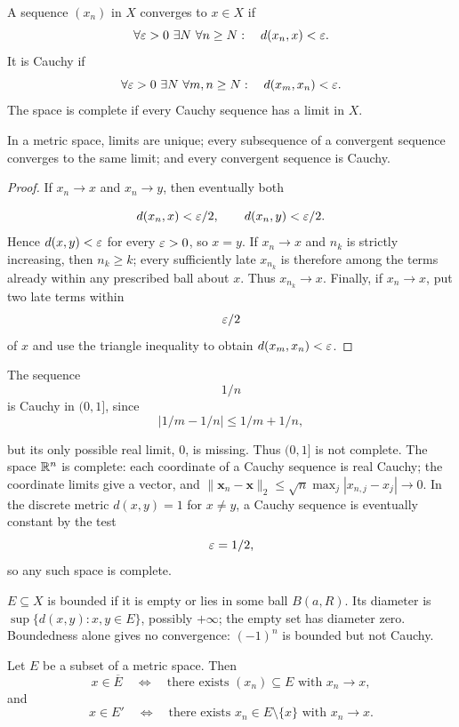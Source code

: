 \begin{definition}
A sequence $(x_n)$ in $X$ converges to $x\in X$ if
\[
\forall\varepsilon>0\ \exists N\ \forall n\geq N:\quad d(x_n,x)<\varepsilon.
\]
It is Cauchy if
\[
\forall\varepsilon>0\ \exists N\ \forall m,n\geq N:\quad d(x_m,x_n)<\varepsilon.
\]
The space is complete if every Cauchy sequence has a limit in $X$.
\end{definition}
\begin{proposition}
\label{prop:metric-sequence-laws}
In a metric space, limits are unique; every subsequence of a convergent
sequence converges to the same limit; and every convergent sequence is Cauchy.
\end{proposition}
\begin{proof}
If $x_n\to x$ and $x_n\to y$, then eventually both

\[
d(x_n,x)<\varepsilon/2,\qquad d(x_n,y)<\varepsilon/2.
\]
 Hence
$d(x,y)<\varepsilon$ for every $\varepsilon>0$, so $x=y$. If $x_n\to x$ and
$n_k$ is strictly increasing, then $n_k\geq k$; every sufficiently late
$x_{n_k}$ is therefore among the terms already within any prescribed ball
about $x$. Thus $x_{n_k}\to x$. Finally, if $x_n\to x$, put two late
terms within
\[
\varepsilon/2
\]
 of $x$ and use the triangle inequality to obtain
$d(x_m,x_n)<\varepsilon$.
\end{proof}
\begin{example}
The sequence
\[
1/n
\]
 is Cauchy in $(0,1]$, since
\[
|1/m-1/n|\leq1/m+1/n,
\]

but its only possible real limit, $0$, is missing. Thus $(0,1]$ is not
complete. The space $\mathbb{R}^n$ is complete: each coordinate of a Cauchy sequence
is real Cauchy; the coordinate limits give a vector, and
$\|\mathbf{x}_n-\mathbf{x}\|_2\leq\sqrt n\max_j|x_{n,j}-x_j|\to0$.
In the discrete metric $d(x,y)=1$ for $x\ne y$, a Cauchy sequence is
eventually constant by the test
\[
\varepsilon=1/2,
\]
 so any such space is complete.
\end{example}
\begin{definition}
$E\subseteq X$ is bounded if it is empty or lies in some ball $B(a,R)$.
Its diameter is $\sup\{d(x,y):x,y\in E\}$, possibly $+\infty$;
the empty set has diameter zero. Boundedness alone gives no convergence:
$(-1)^n$ is bounded but not Cauchy.
\end{definition}
\begin{theorem}
\label{thm:sequential-closure}
Let $E$ be a subset of a metric space. Then
\[
x\in\overline E
\quad\Longleftrightarrow\quad
\text{there exists }(x_n)\subseteq E\text{ with }x_n\to x,
\]
and
\[
x\in E'
\quad\Longleftrightarrow\quad
\text{there exists }x_n\in E\setminus\{x\}\text{ with }x_n\to x.
\]
\end{theorem}
